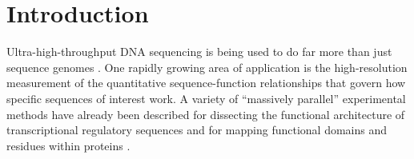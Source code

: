 \documentclass{bmcart}
\begin{document}
\begin{frontmatter}
\begin{abstractbox}
\begin{keyword}
\end{keyword}


\end{abstractbox}
%

\end{frontmatter}





\section*{Introduction}

Ultra-high-throughput DNA sequencing is being used to do far more than just sequence genomes \cite{Shendure:2012et}. One rapidly growing area of application is the high-resolution measurement of  the quantitative sequence-function relationships that govern how specific sequences of interest work. A variety of ``massively parallel'' experimental methods have already been described for dissecting the functional architecture of transcriptional regulatory sequences \cite{Haberle:2012ec,White:2015eta,Inoue:2015cs} and for mapping functional domains and residues within proteins \cite{Fowler:2014gq}. 
\end{document}
